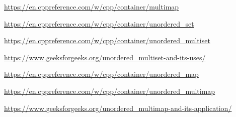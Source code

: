 \begin{thebibliography}{99}
\url{https://en.cppreference.com/w/cpp/container/multimap}

\url{https://en.cppreference.com/w/cpp/container/unordered_set}

\url{https://en.cppreference.com/w/cpp/container/unordered_multiset}

\url{https://www.geeksforgeeks.org/unordered_multiset-and-its-uses/}

\url{https://en.cppreference.com/w/cpp/container/unordered_map}

\url{https://en.cppreference.com/w/cpp/container/unordered_multimap}

\url{https://www.geeksforgeeks.org/unordered_multimap-and-its-application/}

\end{thebibliography}
